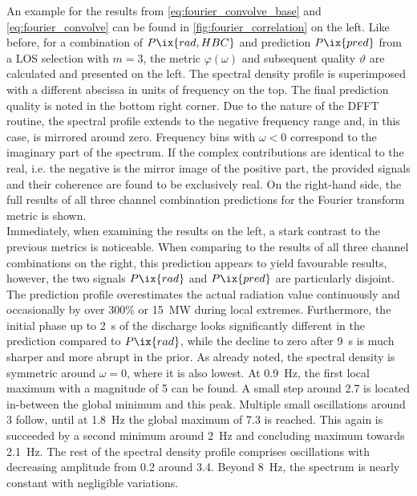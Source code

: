                 An example for the results from \cref{eq:fourier_convolve_base} and \cref{eq:fourier_convolve} can be found in \cref{fig:fourier_correlation} on the left. Like before, for a combination of $P\ix{rad,HBC}$ and prediction $P\ix{pred}$ from a LOS  selection with $m=3$, the metric $\varphi\left(\omega\right)$ and subsequent quality $\vartheta$ are calculated and presented on the left. The spectral density profile is superimposed with a different abscissa in units of frequency on the top. The final prediction quality is noted in the bottom right corner. Due to the nature of the DFFT routine, the spectral profile extends to the negative frequency range and, in this case, is mirrored around zero. Frequency bins with $\omega<0$ correspond to the imaginary part of the spectrum. If the complex contributions are identical to the real, i.e. the negative is the mirror image of the positive part, the provided signals and their coherence are found to be exclusively real\cite{Cooley1965}. On the right-hand side, the full results of all three channel combination predictions for the Fourier transform metric is shown.\\%
                Immediately, when examining the results on the left, a stark contrast to the previous metrics is noticeable. When comparing to the results of all three channel combinations on the right, this prediction appears to yield favourable results, however, the two signals $P\ix{rad}$ and $P\ix{pred}$ are particularly disjoint. The prediction profile overestimates the actual radiation value continuously and occasionally by over 300\% or \SI{15}{\mega\watt} during local extremes. Furthermore, the initial phase up to \SI{2}{\second} of the discharge looks significantly different in the prediction compared to $P\ix{rad}$, while the decline to zero after \SI{9}{\second} is much sharper and more abrupt in the prior. As already noted, the spectral density is symmetric around $\omega=0$, where it is also lowest. At \SI{0.9}{\hertz}, the first local maximum with a magnitude of \SI{5}{\arbitraryunit} can be found. A small step around \SI{2.7}{\arbitraryunit} is located in-between the global minimum and this peak. Multiple small oscillations around \SI{3}{\arbitraryunit} follow, until at \SI{1.8}{\hertz} the global maximum of \SI{7.3}{\arbitraryunit} is reached. This again is succeeded by a second minimum around \SI{2}{\hertz} and concluding maximum towards \SI{2.1}{\hertz}. The rest of the spectral density profile comprises oscillations with decreasing amplitude from \SI{0.2}{\arbitraryunit} around \SI{3.4}{\arbitraryunit}. Beyond \SI{8}{\hertz}, the spectrum is nearly constant with negligible variations.\\%
